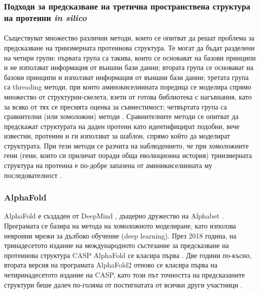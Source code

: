 \documentclass[pdftex,cyrillic,14pt,a4page,twoside,openright]{extreport}
\begin{document}
\subsubsection{Подходи за предсказване на третична пространствена структура на протеини \emph{in silico}}
\paragraph{}
Съществуват множество различни методи, които се опитват да решат проблема за предсказване на триизмерната протеинова структура. Те могат да бъдат разделени на четири групи: първата група са такива, които се основават на базови принципи и не използват информация от външни бази данни; втората група се основават на базови принципи и използват информация от външни бази данни; третата група са threading методи, при които аминокиселиината поредица се моделира спрямо множество от структурни-скелета, взети от готова библиотека с нагъвнания, като за всяко от тях се пресмята оценка за съвместимост; четвъртата група са сравнителни (или хомоложни) методи \cite{dorn2014}. Сравнителните методи се опитват да предскажат структурата на даден протеин като идентифицират подобни, вече известни, протеини и ги използват за шаблон, спрямо който да моделират структурата. При тези методи се разчита на наблюдението, че при хомоложните гени (гени, които си приличат поради обща еволюционна история) триизмерната структура на протеина е по-добре запазена от аминикиселинната му последователност \cite{illergard2009}.


\subsubsection{AlphaFold}\label{sec:alphafold}
AlphaFold е създаден от DeepMind \cite{deepmind}, дъщерно дружество на Alphabet \cite{alphabet}. Програмата се базира на метода на хомоложното моделиране, като използва невронни мрежи за дълбоко обучение (deep learning). През 2018 година, на тринадесетото издание на международното състезание за предсказване на протеинова структура CASP AlphaFold се класира първа \cite{alquraishi2019}. Две години по-късно, втората версия на програмата AlphaFold2 отново се класира първа на четиринадесетото издание на CASP, като този път точността на предсказаните структури беше далеч по-голяма от постигнатата от всички други участници \cite{alphafold2021}.
\end{document}
